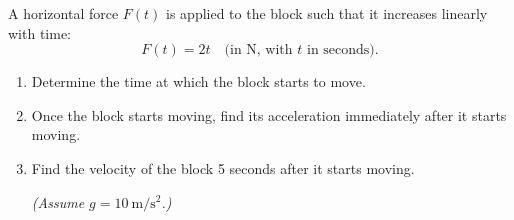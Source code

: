 \documentclass[../main.tex]{subfiles}
\begin{document}
\begin{enumerate}
A horizontal force $F(t)$ is applied to the block such that it increases linearly with time:
\[
F(t) = 2t \quad \text{(in N, with $t$ in seconds)}.
\]

\begin{enumerate}
    \item Determine the time at which the block starts to move.
    \item Once the block starts moving, find its acceleration immediately after it starts moving.
    \item Find the velocity of the block 5 seconds after it starts moving. 

\textit{(Assume $g = 10~\mathrm{m/s^2}$.)}
\end{enumerate}
          
\end{enumerate}
\end{document}
